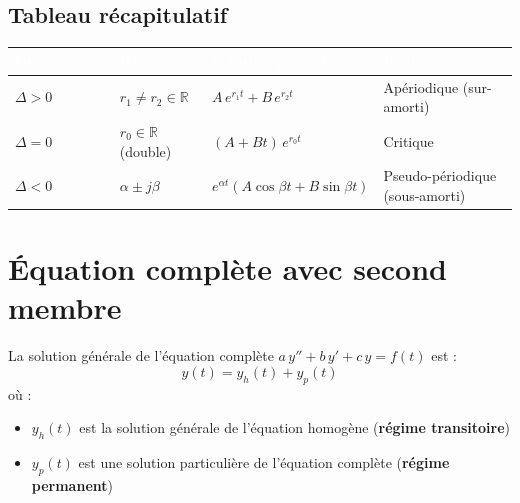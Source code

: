 \documentclass[a4paper,11pt]{article}
\begin{document}

\subsection{Tableau récapitulatif}

\begin{center}
\renewcommand{\arraystretch}{1.6}
\begin{tabular}{|>{\centering\arraybackslash}m{2.5cm}|>{\centering\arraybackslash}m{3.5cm}|>{\centering\arraybackslash}m{4.5cm}|>{\centering\arraybackslash}m{3.5cm}|}
\hline
\rowcolor{uimmblue}
\textcolor{white}{\textbf{Discriminant}} & \textcolor{white}{\textbf{Racines}} & \textcolor{white}{\textbf{Solution générale}} & \textcolor{white}{\textbf{Régime}} \\
\hline
$\Delta > 0$ & $r_1 \neq r_2 \in \mathbb{R}$ & $A\,e^{r_1 t} + B\,e^{r_2 t}$ & Apériodique (sur-amorti) \\
\hline
$\Delta = 0$ & $r_0 \in \mathbb{R}$ (double) & $(A + Bt)\,e^{r_0 t}$ & Critique \\
\hline
$\Delta < 0$ & $\alpha \pm j\beta$ & $e^{\alpha t}(A\cos\beta t + B\sin\beta t)$ & Pseudo-périodique (sous-amorti) \\
\hline
\end{tabular}
\end{center}

\newpage
\section{Équation complète avec second membre}

\begin{theoreme}
La solution générale de l'équation complète $a\,y'' + b\,y' + c\,y = f(t)$ est :
\[
\boxed{y(t) = y_h(t) + y_p(t)}
\]
où :
\begin{itemize}
  \item $y_h(t)$ est la solution générale de l'équation homogène (\textbf{régime transitoire})
  \item $y_p(t)$ est une solution particulière de l'équation complète (\textbf{régime permanent})
\end{itemize}
\end{theoreme}
\end{document}
